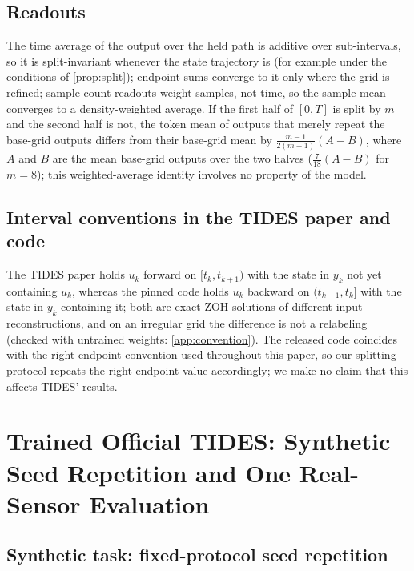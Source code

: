 \documentclass{article}
\theoremstyle{plain}
\theoremstyle{definition}
\theoremstyle{remark}
\begin{document}
\subsection{Readouts}
\label{sec:readout-analysis}
The time average of the output over the held path is additive over sub-intervals, so it is split-invariant whenever the state trajectory is (for example under the conditions of \cref{prop:split}); endpoint sums converge to it only where the grid is refined; sample-count readouts weight samples, not time, so the sample mean converges to a density-weighted average.
If the first half of $[0,T]$ is split by $m$ and the second half is not, the token mean of outputs that merely repeat the base-grid outputs differs from their base-grid mean by $\frac{m-1}{2(m+1)}(A-B)$, where $A$ and $B$ are the mean base-grid outputs over the two halves ($\frac{7}{18}(A-B)$ for $m{=}8$); this weighted-average identity involves no property of the model.

\subsection{Interval conventions in the TIDES paper and code}
\label{sec:convention}

The TIDES paper holds $u_k$ forward on $[t_k,t_{k+1})$ with the state in $y_k$ not yet containing $u_k$, whereas the pinned code holds $u_k$ backward on $(t_{k-1},t_k]$ with the state in $y_k$ containing it; both are exact ZOH solutions of different input reconstructions, and on an irregular grid the difference is not a relabeling (checked with untrained weights: \cref{app:convention}).
The released code coincides with the right-endpoint convention used throughout this paper, so our splitting protocol repeats the right-endpoint value accordingly; we make no claim that this affects TIDES' results.

\section{Trained Official TIDES: Synthetic Seed Repetition and One Real-Sensor Evaluation}
\label{sec:real}

\subsection{Synthetic task: fixed-protocol seed repetition}
\label{sec:real-syn}
\end{document}
